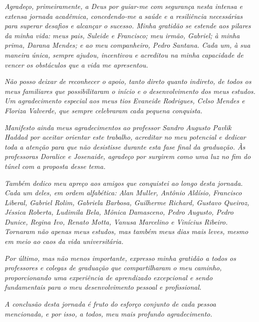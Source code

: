 \begin{agradecimentos}
 
\textit{Agradeço, primeiramente, a Deus por guiar-me com segurança nesta intensa e extensa jornada acadêmica, concedendo-me a saúde e a resiliência necessárias para superar desafios e alcançar o sucesso. Minha gratidão se estende aos pilares da minha vida: meus pais, Suleide e Francisco; meu irmão, Gabriel; à minha prima, Darana Mendes; e ao meu companheiro, Pedro Santana. Cada um, à sua maneira única, sempre ajudou, incentivou e acreditou na minha capacidade de vencer os obstáculos que a vida me apresentou.}

\textit{Não posso deixar de reconhecer o apoio, tanto direto quanto indireto, de todos os meus familiares que possibilitaram o início e o desenvolvimento dos meus estudos. Um agradecimento especial aos meus tios Evaneide Rodrigues, Celso Mendes e Floriza Valverde, que sempre celebraram cada pequena conquista.}

\textit{Manifesto ainda meus agradecimentos ao professor Sandro Augusto Pavlik Haddad por aceitar orientar este trabalho, acreditar no meu potencial e dedicar toda a atenção para que não desistisse durante esta fase final da graduação. Às professoras Doralice e Josenaide, agradeço por surgirem como uma luz no fim do túnel com a proposta desse tema.}

\textit{Também dedico meu apreço aos amigos que conquistei ao longo desta jornada. Cada um deles, em ordem alfabética: Alan Muller, Antônio Aldísio, Francisco Liberal, Gabriel Rolim, Gabriela Barbosa, Guilherme Richard, Gustavo Queiroz, Jéssica Roberta, Ludimila Bela, Mônica Damasceno, Pedro Augusto, Pedro Dunice, Regina Ivo, Renato Motta, Vanusa Marcelino e Vinícius Ribeiro. Tornaram não apenas meus estudos, mas também meus dias mais leves, mesmo em meio ao caos da vida universitária.}

\textit{Por último, mas não menos importante, expresso minha gratidão a todos os professores e colegas de graduação que compartilharam o meu caminho, proporcionando uma experiência de aprendizado excepcional e sendo fundamentais para o meu desenvolvimento pessoal e profissional.}

\textit{A conclusão desta jornada é fruto do esforço conjunto de cada pessoa mencionada, e por isso, a todos, meu mais profundo agradecimento.}

\end{agradecimentos}
